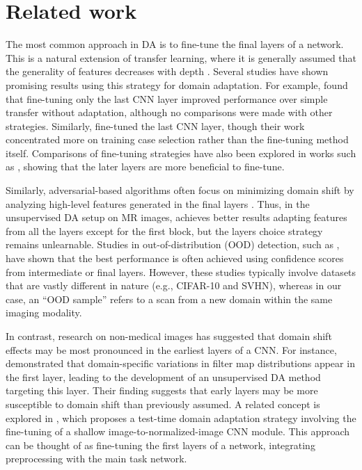 \section{Related work}

The most common approach in DA is to fine-tune the final layers of a network. This is a natural extension of transfer learning, where it is generally assumed that the generality of features decreases with depth \cite{yosinski2014transferable}. Several studies have shown promising results using this strategy for domain adaptation. For example, \cite{kushibar2019supervised} found that fine-tuning only the last CNN layer improved performance over simple transfer without adaptation, although no comparisons were made with other strategies. Similarly, \cite{valindria2018domain} fine-tuned the last CNN layer, though their work concentrated more on training case selection rather than the fine-tuning method itself. Comparisons of fine-tuning strategies have also been explored in works such as \cite{valverde2019one,ghafoorian2017transfer}, showing that the later layers are more beneficial to fine-tune.

Similarly, adversarial-based algorithms often focus on minimizing domain shift by analyzing high-level features generated in the final layers \cite{ganin2015unsupervised}. Thus, in the unsupervised DA setup on MR images, \cite{kamnitsas2017unsupervised} achieves better results adapting features from all the layers except for the first block, but the layers choice strategy remains unlearnable. Studies in out-of-distribution (OOD) detection, such as \cite{lee2018simple,erdil2020unsupervised}, have shown that the best performance is often achieved using confidence scores from intermediate or final layers. However, these studies typically involve datasets that are vastly different in nature (e.g., CIFAR-10 and SVHN), whereas in our case, an ``OOD sample'' refers to a scan from a new domain within the same imaging modality.

In contrast, research on non-medical images has suggested that domain shift effects may be most pronounced in the earliest layers of a CNN. For instance, \cite{aljundi2016lightweight} demonstrated that domain-specific variations in filter map distributions appear in the first layer, leading to the development of an unsupervised DA method targeting this layer. Their finding suggests that early layers may be more susceptible to domain shift than previously assumed. A related concept is explored in \cite{karani2021test}, which proposes a test-time domain adaptation strategy involving the fine-tuning of a shallow image-to-normalized-image CNN module. This approach can be thought of as fine-tuning the first layers of a network, integrating preprocessing with the main task network.

